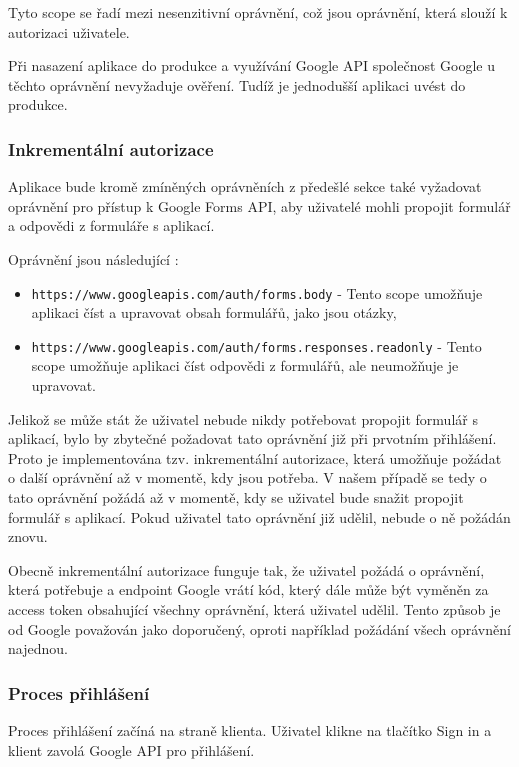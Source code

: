 Tyto scope se řadí mezi nesenzitivní oprávnění, což jsou oprávnění, která slouží k autorizaci uživatele. 
\cite{google_drive_auth_guide}

Při nasazení aplikace do produkce a využívání Google API společnost Google u těchto oprávnění nevyžaduje ověření. Tudíž je jednodušší aplikaci uvést do produkce.
\cite{google_app_verification}

\subsubsection{Inkrementální autorizace} \label{auth_incremental}
Aplikace bude kromě zmíněných oprávněních z předešlé sekce také vyžadovat oprávnění pro přístup k Google Forms API, aby uživatelé mohli propojit formulář a odpovědi z formuláře s aplikací. 

Oprávnění jsou následující \cite{google_oauth_scopes}:
\begin{itemize}
    \item \texttt{https://www.googleapis.com/auth/forms.body} - Tento scope umožňuje aplikaci číst a upravovat obsah formulářů, jako jsou otázky,
    \item \texttt{https://www.googleapis.com/auth/forms.responses.readonly} - Tento scope umožňuje aplikaci číst odpovědi z formulářů, ale neumožňuje je upravovat.
\end{itemize}

Jelikož se může stát že uživatel nebude nikdy potřebovat propojit formulář s aplikací, bylo by zbytečné požadovat tato oprávnění již při prvotním přihlášení. Proto je implementována tzv. inkrementální autorizace, která umožňuje požádat o další oprávnění až v momentě, kdy jsou potřeba. V našem případě se tedy o tato oprávnění požádá až v momentě, kdy se uživatel bude snažit propojit formulář s aplikací. Pokud uživatel tato oprávnění již udělil, nebude o ně požádán znovu. \cite{google_oauth_incremental_auth}

Obecně inkrementální autorizace funguje tak, že uživatel požádá o oprávnění, která potřebuje a endpoint Google vrátí kód, který dále může být vyměněn za access token obsahující všechny oprávnění, která uživatel udělil. Tento způsob je od Google považován jako doporučený, oproti například požádání všech oprávnění najednou. \cite{google_oauth_incremental_auth} 

\subsubsection{Proces přihlášení}
Proces přihlášení začíná na straně klienta. Uživatel klikne na tlačítko Sign in a klient zavolá Google API pro přihlášení.

